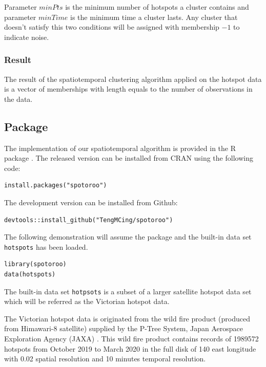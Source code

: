 Parameter \(minPts\) is the minimum number of hotspots a cluster
contains and parameter \(minTime\) is the minimum time a cluster lasts.
Any cluster that doesn't satisfy this two conditions will be assigned
with membership \(-1\) to indicate noise.

\hypertarget{result}{%
\subsubsection{Result}\label{result}}

The result of the spatiotemporal clustering algorithm applied on the
hotspot data is a vector of memberships with length equals to the number
of observations in the data.

\hypertarget{package}{%
\subsection{Package}\label{package}}

The implementation of our spatiotemporal algorithm is provided in the R
package . The released version can be installed from
CRAN using the following code:

\begin{verbatim}
install.packages("spotoroo")
\end{verbatim}

The development version can be installed from Github:

\begin{verbatim}
devtools::install_github("TengMCing/spotoroo")
\end{verbatim}

The following demonstration will assume the package 
and the built-in data set \texttt{hotspots} has been loaded.

\begin{verbatim}
library(spotoroo)
data(hotspots)
\end{verbatim}

The built-in data set \texttt{hotpsots} is a subset of a larger
satellite hotspot data set which will be referred as the Victorian
hotspot data.

The Victorian hotspot data is originated from the wild fire product
(produced from Himawari-8 satellite) supplied by the P-Tree System,
Japan Aerospace Exploration Agency (JAXA) \citeyearpar{jaxa}. This wild
fire product contains records of 1989572 hotspots from October 2019 to
March 2020 in the full disk of 140 \textdegree east longitude with 0.02
\textdegree spatial resolution and 10 minutes temporal resolution.

